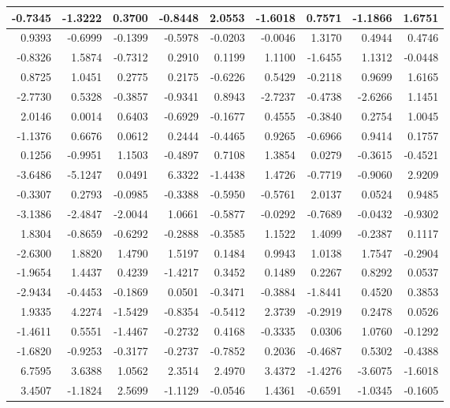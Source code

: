 \documentclass[
  letterpaper,
  DIV=11,
  numbers=noendperiod]{scrreprt}
\begin{document}
\begin{tabular}[t]{r|r|r|r|r|r|r|r|r}
\hline
-0.7345 & -1.3222 & 0.3700 & -0.8448 & 2.0553 & -1.6018 & 0.7571 & -1.1866 & 1.6751\\
\hline
0.9393 & -0.6999 & -0.1399 & -0.5978 & -0.0203 & -0.0046 & 1.3170 & 0.4944 & 0.4746\\
\hline
-0.8326 & 1.5874 & -0.7312 & 0.2910 & 0.1199 & 1.1100 & -1.6455 & 1.1312 & -0.0448\\
\hline
0.8725 & 1.0451 & 0.2775 & 0.2175 & -0.6226 & 0.5429 & -0.2118 & 0.9699 & 1.6165\\
\hline
-2.7730 & 0.5328 & -0.3857 & -0.9341 & 0.8943 & -2.7237 & -0.4738 & -2.6266 & 1.1451\\
\hline
2.0146 & 0.0014 & 0.6403 & -0.6929 & -0.1677 & 0.4555 & -0.3840 & 0.2754 & 1.0045\\
\hline
-1.1376 & 0.6676 & 0.0612 & 0.2444 & -0.4465 & 0.9265 & -0.6966 & 0.9414 & 0.1757\\
\hline
0.1256 & -0.9951 & 1.1503 & -0.4897 & 0.7108 & 1.3854 & 0.0279 & -0.3615 & -0.4521\\
\hline
-3.6486 & -5.1247 & 0.0491 & 6.3322 & -1.4438 & 1.4726 & -0.7719 & -0.9060 & 2.9209\\
\hline
-0.3307 & 0.2793 & -0.0985 & -0.3388 & -0.5950 & -0.5761 & 2.0137 & 0.0524 & 0.9485\\
\hline
-3.1386 & -2.4847 & -2.0044 & 1.0661 & -0.5877 & -0.0292 & -0.7689 & -0.0432 & -0.9302\\
\hline
1.8304 & -0.8659 & -0.6292 & -0.2888 & -0.3585 & 1.1522 & 1.4099 & -0.2387 & 0.1117\\
\hline
-2.6300 & 1.8820 & 1.4790 & 1.5197 & 0.1484 & 0.9943 & 1.0138 & 1.7547 & -0.2904\\
\hline
-1.9654 & 1.4437 & 0.4239 & -1.4217 & 0.3452 & 0.1489 & 0.2267 & 0.8292 & 0.0537\\
\hline
-2.9434 & -0.4453 & -0.1869 & 0.0501 & -0.3471 & -0.3884 & -1.8441 & 0.4520 & 0.3853\\
\hline
1.9335 & 4.2274 & -1.5429 & -0.8354 & -0.5412 & 2.3739 & -0.2919 & 0.2478 & 0.0526\\
\hline
-1.4611 & 0.5551 & -1.4467 & -0.2732 & 0.4168 & -0.3335 & 0.0306 & 1.0760 & -0.1292\\
\hline
-1.6820 & -0.9253 & -0.3177 & -0.2737 & -0.7852 & 0.2036 & -0.4687 & 0.5302 & -0.4388\\
\hline
6.7595 & 3.6388 & 1.0562 & 2.3514 & 2.4970 & 3.4372 & -1.4276 & -3.6075 & -1.6018\\
\hline
3.4507 & -1.1824 & 2.5699 & -1.1129 & -0.0546 & 1.4361 & -0.6591 & -1.0345 & -0.1605\\

\end{tabular}
\end{document}
